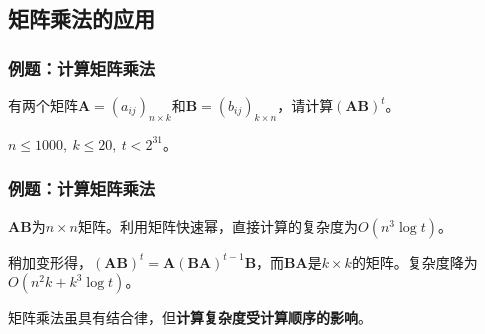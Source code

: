 \documentclass[9pt,dvipsnames]{beamer}
\begin{document}
\subsection{矩阵乘法的应用}
\begin{frame}
	\frametitle{例题：计算矩阵乘法}
	有两个矩阵$\mathbf{A}=(a_{ij})_{n\times k}$和$\mathbf{B}=(b_{ij})_{k\times n}$，请计算$(\mathbf{AB})^t$。

	$n\leq 1000,\ k\leq 20,\ t<2^{31}$。
\end{frame}
\begin{frame}
	\frametitle{例题：计算矩阵乘法}
	$\mathbf{AB}$为$n\times n$矩阵。利用矩阵快速幂，直接计算的复杂度为$O(n^3\log t)$。\pause

	稍加变形得，$(\mathbf{AB})^t=\mathbf{A}(\mathbf{BA})^{t-1}\mathbf{B}$，而$\mathbf{BA}$是$k\times k$的矩阵。复杂度降为$O(n^2k+k^3\log t)$。\pause

	矩阵乘法虽具有结合律，但\textbf{计算复杂度受计算顺序的影响}。
\end{frame}
\end{document}
